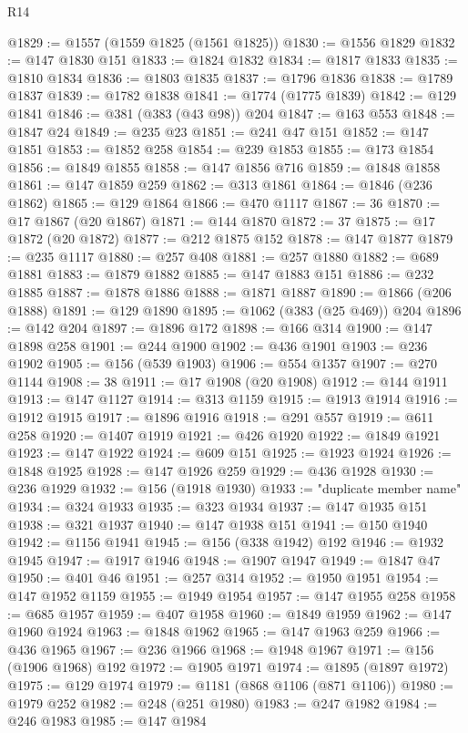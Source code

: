 \begin{lexlean}{R14}
\begin{coremodule}
@1829 := @1557 (@1559 @1825 (@1561 @1825))
@1830 := @1556 @1829
@1832 := @147 @1830 @151
@1833 := @1824 @1832
@1834 := @1817 @1833
@1835 := @1810 @1834
@1836 := @1803 @1835
@1837 := @1796 @1836
@1838 := @1789 @1837
@1839 := @1782 @1838
@1841 := @1774 (@1775 @1839)
@1842 := @129 @1841
@1846 := @381 (@383 (@43 @98)) @204
@1847 := @163 @553
@1848 := @1847 @24
@1849 := @235 @23
@1851 := @241 @47 @151
@1852 := @147 @1851
@1853 := @1852 @258
@1854 := @239 @1853
@1855 := @173 @1854
@1856 := @1849 @1855
@1858 := @147 @1856 @716
@1859 := @1848 @1858
@1861 := @147 @1859 @259
@1862 := @313 @1861
@1864 := @1846 (@236 @1862)
@1865 := @129 @1864
@1866 := @470 @1117
@1867 := 36
@1870 := @17 @1867 (@20 @1867)
@1871 := @144 @1870
@1872 := 37
@1875 := @17 @1872 (@20 @1872)
@1877 := @212 @1875 @152
@1878 := @147 @1877
@1879 := @235 @1117
@1880 := @257 @408
@1881 := @257 @1880
@1882 := @689 @1881
@1883 := @1879 @1882
@1885 := @147 @1883 @151
@1886 := @232 @1885
@1887 := @1878 @1886
@1888 := @1871 @1887
@1890 := @1866 (@206 @1888)
@1891 := @129 @1890
@1895 := @1062 (@383 (@25 @469)) @204
@1896 := @142 @204
@1897 := @1896 @172
@1898 := @166 @314
@1900 := @147 @1898 @258
@1901 := @244 @1900
@1902 := @436 @1901
@1903 := @236 @1902
@1905 := @156 (@539 @1903)
@1906 := @554 @1357
@1907 := @270 @1144
@1908 := 38
@1911 := @17 @1908 (@20 @1908)
@1912 := @144 @1911
@1913 := @147 @1127
@1914 := @313 @1159
@1915 := @1913 @1914
@1916 := @1912 @1915
@1917 := @1896 @1916
@1918 := @291 @557
@1919 := @611 @258
@1920 := @1407 @1919
@1921 := @426 @1920
@1922 := @1849 @1921
@1923 := @147 @1922
@1924 := @609 @151
@1925 := @1923 @1924
@1926 := @1848 @1925
@1928 := @147 @1926 @259
@1929 := @436 @1928
@1930 := @236 @1929
@1932 := @156 (@1918 @1930)
@1933 := "duplicate member name"
@1934 := @324 @1933
@1935 := @323 @1934
@1937 := @147 @1935 @151
@1938 := @321 @1937
@1940 := @147 @1938 @151
@1941 := @150 @1940
@1942 := @1156 @1941
@1945 := @156 (@338 @1942) @192
@1946 := @1932 @1945
@1947 := @1917 @1946
@1948 := @1907 @1947
@1949 := @1847 @47
@1950 := @401 @46
@1951 := @257 @314
@1952 := @1950 @1951
@1954 := @147 @1952 @1159
@1955 := @1949 @1954
@1957 := @147 @1955 @258
@1958 := @685 @1957
@1959 := @407 @1958
@1960 := @1849 @1959
@1962 := @147 @1960 @1924
@1963 := @1848 @1962
@1965 := @147 @1963 @259
@1966 := @436 @1965
@1967 := @236 @1966
@1968 := @1948 @1967
@1971 := @156 (@1906 @1968) @192
@1972 := @1905 @1971
@1974 := @1895 (@1897 @1972)
@1975 := @129 @1974
@1979 := @1181 (@868 @1106 (@871 @1106))
@1980 := @1979 @252
@1982 := @248 (@251 @1980)
@1983 := @247 @1982
@1984 := @246 @1983
@1985 := @147 @1984

\end{coremodule}
\end{lexlean}
